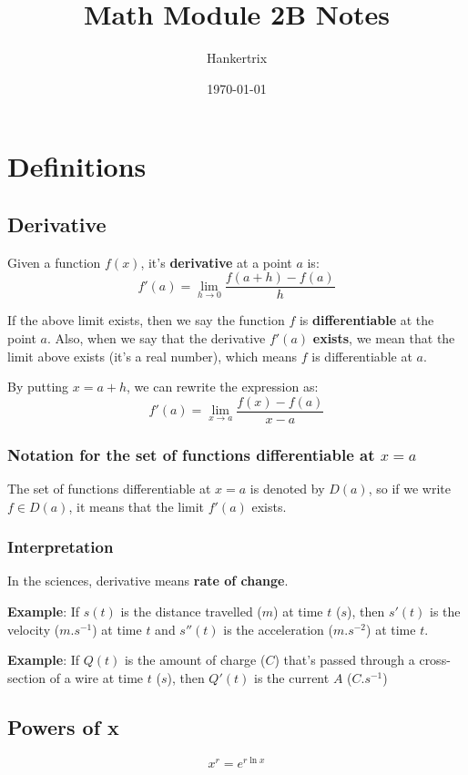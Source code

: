 \documentclass[11pt]{article}
\author{Hankertrix}
\date{\today}
\title{Math Module 2B Notes}
\begin{document}
\maketitle
\setcounter{tocdepth}{2}
\tableofcontents \clearpage\section{Definitions}
\label{sec:org4d08b1f}

\subsection{Derivative}
\label{sec:org10c1c8d}
Given a function \(f(x)\), it's \textbf{derivative} at a point \(a\) is:
\[f'(a) = \lim_{h \rightarrow 0} \frac{f(a + h) - f(a)}{h}\]

If the above limit exists, then we say the function \(f\) is \textbf{differentiable} at the point \(a\). Also, when we say that the derivative \(f'(a)\) \textbf{exists}, we mean that the limit above exists (it's a real number), which means \(f\) is differentiable at \(a\).


By putting \(x = a + h\), we can rewrite the expression as:
\[f'(a) = \lim_{x \rightarrow a} \frac{f(x) - f(a)}{x - a}\]
\subsubsection{Notation for the set of functions differentiable at \(x = a\)}
\label{sec:org97b2505}
The set of functions differentiable at \(x = a\) is denoted by \(D(a)\), so if we write \(f \in D(a)\), it means that the limit \(f'(a)\) exists.
\subsubsection{Interpretation}
\label{sec:orgce7f12b}
In the sciences, derivative means \textbf{rate of change}.

\textbf{Example}: If \(s(t)\) is the distance travelled (\(\unit{m}\)) at time \(t\) (\(\unit{s}\)), then \(s'(t)\) is the velocity (\(\unit{m.s^{-1}}\)) at time \(t\) and \(s''(t)\) is the acceleration (\(\unit{m.s^{-2}}\)) at time \(t\).


\textbf{Example}: If \(Q(t)\) is the amount of charge (\(\unit{C}\)) that's passed through a cross-section of a wire at time \(t\) (\(\unit{s}\)), then \(Q'(t)\) is the current \(A\) (\(\unit{C.s^{-1}}\))

\newpage
\subsection{Powers of x}
\label{sec:org1f0c5cb}
\[x^r = e^{r \ln x}\]
\end{document}
